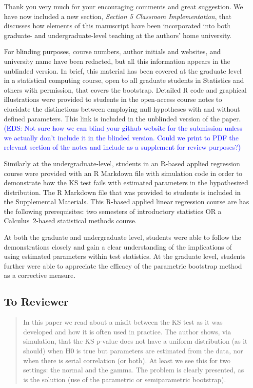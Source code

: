 \documentclass[12pt]{article}
\newcommand{\eds}[1]{\textcolor{blue}{(EDS: #1)}}
\newenvironment{comment}%
{\begin{quotation}\noindent\small\it\color{darkblue}\ignorespaces%
}{\end{quotation}}
\begin{document}
Thank you very much for your encouraging comments and great suggestion.  
We have now included a new section, \textit{Section 5 Classroom Implementation},
that discusses how elements of this manuscript have been incorporated into both 
graduate- and undergraduate-level teaching at the authors' home university. 
 

For blinding purposes, course numbers, author initials and websites, and 
university name have been redacted, but all this information appears in the 
unblinded version.  In brief, this material has been covered at the graduate
level in a statistical computing course, open to all graduate students in 
Statistics and others with permission, that covers the bootstrap. Detailed R 
code and graphical illustrations were provided to students in the open-access 
course notes to elucidate the distinctions between employing null
hypotheses with and without defined parameters.  This link is included in the 
unblinded version of the paper. \eds{Not sure how we can blind your github 
website for the submission unless we actually don't include it in the blinded 
version. Could we print to PDF the relevant section of the notes and include as 
a supplement for review purposes?} 


Similarly at the undergraduate-level, students in an R-based applied regression 
course were provided with an R Markdown file with simulation code in order to 
demonstrate how the KS test fails with estimated parameters in the hypothesized 
distribution. The R Markdown file that was provided to students is included in 
the Supplemental Materials. This R-based applied linear regression course are 
has the following prerequisites: two semesters of introductory statistics OR a 
Calculus~2-based statistical methods course.


At both the graduate and undergraduate level, students were able to follow the 
demonstrations closely and gain a clear understanding of the implications of 
using estimated parameters within test statistics.  At the graduate level, 
students further were able to appreciate the efficacy of the parametric 
bootstrap method as a corrective measure.



\subsection*{To Reviewer}


\begin{comment}
In this paper we read about a misfit between the KS test as it was developed and 
how it is often used in practice. The author shows, via simulation, that the KS 
p-value does not have a uniform distribution (as it should) when H0 is true but 
parameters are estimated from the data, nor when there is serial correlation 
(or both). At least we see this for two settings: the normal and the gamma. The 
problem is clearly presented, as is the solution (use of the parametric or 
semiparametric bootstrap).
\end{comment}
\end{document}

